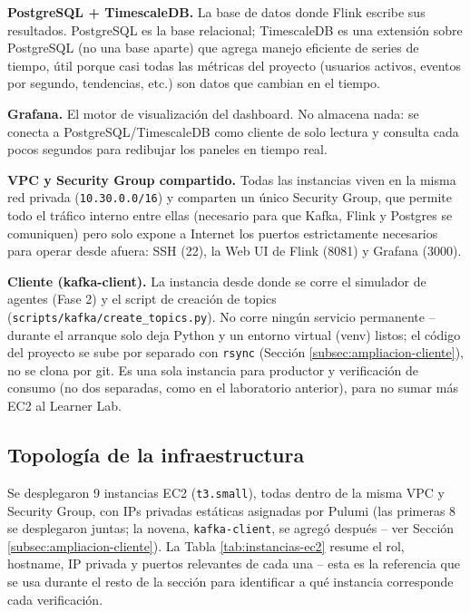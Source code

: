 \textbf{PostgreSQL + TimescaleDB.} La base de datos donde Flink escribe sus resultados. PostgreSQL es la base relacional; TimescaleDB es una extensión sobre PostgreSQL (no una base aparte) que agrega manejo eficiente de series de tiempo, útil porque casi todas las métricas del proyecto (usuarios activos, eventos por segundo, tendencias, etc.) son datos que cambian en el tiempo.

\textbf{Grafana.} El motor de visualización del dashboard. No almacena nada: se conecta a PostgreSQL/TimescaleDB como cliente de solo lectura y consulta cada pocos segundos para redibujar los paneles en tiempo real.

\textbf{VPC y Security Group compartido.} Todas las instancias viven en la misma red privada (\texttt{10.30.0.0/16}) y comparten un único Security Group, que permite todo el tráfico interno entre ellas (necesario para que Kafka, Flink y Postgres se comuniquen) pero solo expone a Internet los puertos estrictamente necesarios para operar desde afuera: SSH (22), la Web UI de Flink (8081) y Grafana (3000).

\textbf{Cliente (kafka-client).} La instancia desde donde se corre el simulador de agentes (Fase 2) y el script de creación de topics (\texttt{scripts/kafka/create\_topics.py}). No corre ningún servicio permanente -- durante el arranque solo deja Python y un entorno virtual (venv) listos; el código del proyecto se sube por separado con \texttt{rsync} (Sección \ref{subsec:ampliacion-cliente}), no se clona por git. Es una sola instancia para productor y verificación de consumo (no dos separadas, como en el laboratorio anterior), para no sumar más EC2 al Learner Lab.

\subsection{Topología de la infraestructura}

Se desplegaron 9 instancias EC2 (\texttt{t3.small}), todas dentro de la misma VPC y Security Group, con IPs privadas estáticas asignadas por Pulumi (las primeras 8 se desplegaron juntas; la novena, \texttt{kafka-client}, se agregó después -- ver Sección \ref{subsec:ampliacion-cliente}). La Tabla \ref{tab:instancias-ec2} resume el rol, hostname, IP privada y puertos relevantes de cada una -- esta es la referencia que se usa durante el resto de la sección para identificar a qué instancia corresponde cada verificación.

